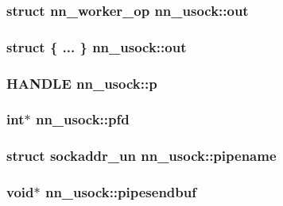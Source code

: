 \subsubsection[{out}]{\setlength{\rightskip}{0pt plus 5cm}struct {\bf nn\+\_\+worker\+\_\+op} nn\+\_\+usock\+::out}\hypertarget{structnn__usock_ad3e30db9d5d87d8b071d7acf7383ce29}{}\label{structnn__usock_ad3e30db9d5d87d8b071d7acf7383ce29}
\subsubsection[{out}]{\setlength{\rightskip}{0pt plus 5cm}struct \{ ... \}   nn\+\_\+usock\+::out}\hypertarget{structnn__usock_af4fcf132e39cf53c079b4f8e290eaed1}{}\label{structnn__usock_af4fcf132e39cf53c079b4f8e290eaed1}
\subsubsection[{p}]{\setlength{\rightskip}{0pt plus 5cm}H\+A\+N\+D\+LE nn\+\_\+usock\+::p}\hypertarget{structnn__usock_a156a09f286268517711bc6d13137be3d}{}\label{structnn__usock_a156a09f286268517711bc6d13137be3d}
\subsubsection[{pfd}]{\setlength{\rightskip}{0pt plus 5cm}int$\ast$ nn\+\_\+usock\+::pfd}\hypertarget{structnn__usock_a0d1f75385c85309c1a0d730ca3edac4e}{}\label{structnn__usock_a0d1f75385c85309c1a0d730ca3edac4e}
\subsubsection[{pipename}]{\setlength{\rightskip}{0pt plus 5cm}struct {\bf sockaddr\+\_\+un} nn\+\_\+usock\+::pipename}\hypertarget{structnn__usock_afaad9f5a27960aee76a305cbae8a47bd}{}\label{structnn__usock_afaad9f5a27960aee76a305cbae8a47bd}
\subsubsection[{pipesendbuf}]{\setlength{\rightskip}{0pt plus 5cm}void$\ast$ nn\+\_\+usock\+::pipesendbuf}\hypertarget{structnn__usock_aa2c6e4b935c29acc433e55ce574965b3}{}\label{structnn__usock_aa2c6e4b935c29acc433e55ce574965b3}
